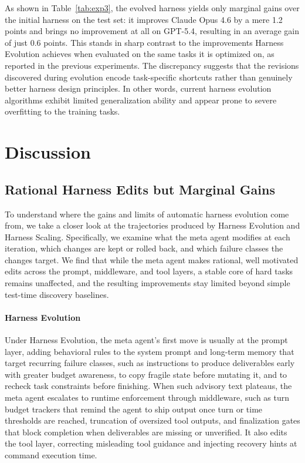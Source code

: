 \documentclass{article}
\begin{document}
As shown in Table~\ref{tab:exp3}, the evolved harness yields only marginal gains over the initial harness on the test set: it improves Claude Opus 4.6 by a mere 1.2 points and brings no improvement at all on GPT-5.4, resulting in an average gain of just 0.6 points. This stands in sharp contrast to the improvements Harness Evolution achieves when evaluated on the same tasks it is optimized on, as reported in the previous experiments. The discrepancy suggests that the revisions discovered during evolution encode task-specific shortcuts rather than genuinely better harness design principles. In other words, current harness evolution algorithms exhibit limited generalization ability and appear prone to severe overfitting to the training tasks. 


\section{Discussion}\label{sec:discussion}

\subsection{Rational Harness Edits but Marginal Gains}
\label{sec:discussion_qualitative}
To understand where the gains and limits of automatic harness evolution come from, we take a closer look at the trajectories produced by Harness Evolution and Harness Scaling. Specifically, we examine what the meta agent modifies at each iteration, which changes are kept or rolled back, and which failure classes the changes target. We find that while the meta agent makes rational, well motivated edits across the prompt, middleware, and tool layers, a stable core of hard tasks remains unaffected, and the resulting improvements stay limited beyond simple test-time discovery baselines.

\paragraph{Harness Evolution}
Under Harness Evolution, the meta agent's first move is usually at the prompt layer, adding behavioral rules to the system prompt and long-term memory that target recurring failure classes, such as instructions to produce deliverables early with greater budget awareness, to copy fragile state before mutating it, and to recheck task constraints before finishing. When such advisory text plateaus, the meta agent escalates to runtime enforcement through middleware, such as turn budget trackers that remind the agent to ship output once turn or time thresholds are reached, truncation of oversized tool outputs, and finalization gates that block completion when deliverables are missing or unverified. It also edits the tool layer, correcting misleading tool guidance and injecting recovery hints at command execution time. 
\end{document}
